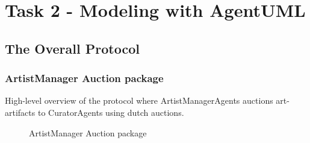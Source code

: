\documentclass[paper=letter, fontsize=12pt]{article}
\begin{document}
\section{Task 2 - Modeling with AgentUML}
\subsection{The Overall Protocol}
\subsubsection{ArtistManager Auction package}
High-level overview of the protocol where ArtistManagerAgents auctions art-artifacts to CuratorAgents using dutch auctions.
\begin{figure}[H]
  \begin{center}
    \caption{ArtistManager Auction package}
    \label{fig:artist_auction_template}
  \end{center}
\end{figure}
\end{document}
